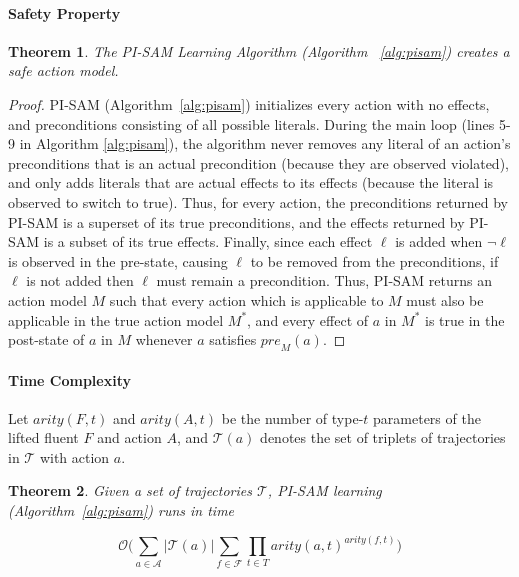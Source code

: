 \documentclass[letterpaper]{article} %
\newtheorem{theorem}{Theorem}
\newcommand{\pre}{\textit{pre}}
\newcommand{\liftf}{F}
\newcommand{\lifta}{A}
\begin{document}
\paragraph{Safety Property}
\begin{theorem}\label{safe-pisam-thm} The PI-SAM Learning Algorithm (Algorithm ~\ref{alg:pisam}) creates a safe action model. 
\end{theorem}
\begin{proof}
PI-SAM (Algorithm~\ref{alg:pisam})  initializes every action with no effects, and preconditions consisting of all possible literals. During the main loop (lines 5-9 in Algorithm \ref{alg:pisam}), the algorithm never removes any literal of an action's preconditions that is an actual precondition (because they are observed violated), and only adds literals that are actual effects to its effects (because the literal is observed to switch to true). Thus, for every action, the preconditions returned by PI-SAM is a superset of its true preconditions, and the effects returned by PI-SAM is a subset of its true effects. Finally, since each effect $\ell$ is added when $\neg\ell$ is observed in the pre-state, causing $\ell$ to be removed from the preconditions, if $\ell$ is not added then $\ell$ must remain a precondition. Thus, PI-SAM returns an action model $M$ such that every action which is applicable to $M$ must also be applicable in the true action model $M^*$, and every effect of $a$ in $M^*$ is true in the post-state of $a$ in $M$ whenever $a$ satisfies $\pre_M(a)$. 
\end{proof}

\paragraph{Time Complexity}

Let $arity(\liftf,t)$ and $arity(\lifta,t)$ be the number of type-$t$ parameters of the lifted fluent $\liftf$ and action $\lifta$, and $\mathcal{T}(a)$ denotes the set of triplets of trajectories in $\mathcal{T}$ with action $a$. %

\begin{theorem}
Given a set of trajectories $\mathcal{T}$, PI-SAM learning (Algorithm~\ref{alg:pisam}) runs in time 
\begin{small}
\[\mathcal{O}\Big(\sum_{a\in \mathcal{A}}|\mathcal{T}(a)|\sum_{f\in\mathcal{F}}\prod_{t\in T}arity(a,t)^{arity(f,t)}\Big)\]
\end{small}
\end{theorem}
\end{document}
